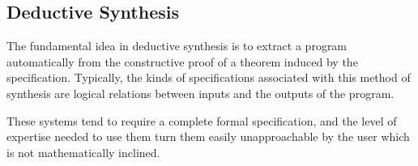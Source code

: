 \subsection{Deductive Synthesis}
\label{sec:deductive-synthesis}

The fundamental idea in deductive synthesis is to extract a program
automatically from the constructive proof of a theorem induced by the
specification. Typically, the kinds of specifications associated with this
method of synthesis are logical relations between inputs and the outputs of the
program. 

These systems tend to require a complete formal specification, and the level
of expertise needed to use them turn them easily unapproachable by the user
which is not mathematically inclined.
